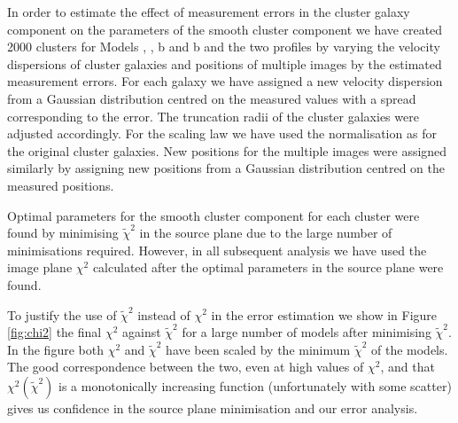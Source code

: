 \documentclass[useAMS,usenatbib]{mn2e}
\newcounter{one}   \setcounter{one}{1}
\newcounter{two}   \setcounter{two}{2}
\begin{document}
In order to estimate the effect of measurement errors in the cluster
galaxy component on the parameters of the smooth cluster component we
have created 2000 clusters for Models , ,
\mbox{b} and \mbox{b} and the two profiles by
varying the velocity dispersions of cluster galaxies and positions of
multiple images by the estimated measurement errors. For each galaxy
we have assigned a new velocity dispersion from a Gaussian
distribution centred on the measured values with a spread
corresponding to the error. The truncation radii of the cluster
galaxies were adjusted accordingly. For the scaling law we have used
the normalisation as for the original cluster galaxies. New positions
for the multiple images were assigned similarly by assigning new
positions from a Gaussian distribution centred on the measured
positions.

Optimal parameters for the smooth cluster component for each cluster
were found by minimising $\widetilde{\chi}^2$ in the source plane due
to the large number of minimisations required. However, in all
subsequent analysis we have used the image plane $\chi^2$ calculated
after the optimal parameters in the source plane were found.

To justify the use of $\widetilde{\chi}^2$ instead of $\chi^2$ in the
error estimation we show in Figure \ref{fig:chi2} the final $\chi^2$
against $\widetilde{\chi}^2$ for a large number of models after
minimising $\widetilde{\chi}^2$. In the figure both $\chi^2$ and
$\widetilde{\chi}^2$ have been scaled by the minimum
$\widetilde{\chi}^2$ of the models. The good correspondence between
the two, even at high values of $\chi^2$, and that
$\chi^2(\widetilde{\chi}^2)$ is a monotonically increasing function
(unfortunately with some scatter) gives us confidence in the source
plane minimisation and our error analysis.
\end{document}
